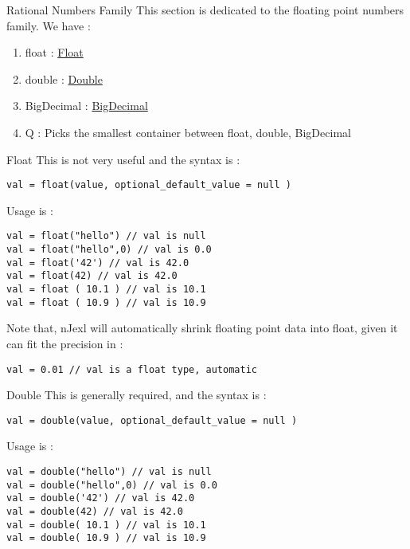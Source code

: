 \begin{section}{Rational Numbers Family}
This section is dedicated to the floating point numbers family.
We have :
\begin{enumerate}
\item{float : \href{https://docs.oracle.com/javase/8/docs/api/java/lang/Float.html}{Float} }
\item{double : \href{https://docs.oracle.com/javase/8/docs/api/java/lang/Double.html}{Double}}
\item{BigDecimal : \href{https://docs.oracle.com/javase/8/docs/api/java/math/BigDecimal.html}{BigDecimal} }
\item{Q : Picks the smallest container between float, double, BigDecimal }
\end{enumerate}

\begin{subsection}{Float}
This is not very useful and the syntax is :

\begin{lstlisting}[style=JexlStyle]
val = float(value, optional_default_value = null )
\end{lstlisting}

Usage is :

\begin{lstlisting}[style=JexlStyle]
val = float("hello") // val is null
val = float("hello",0) // val is 0.0
val = float('42') // val is 42.0 
val = float(42) // val is 42.0 
val = float ( 10.1 ) // val is 10.1 
val = float ( 10.9 ) // val is 10.9 
\end{lstlisting}
Note that, nJexl will automatically shrink floating point data into float, 
given it can fit the precision in :

\begin{lstlisting}[style=JexlStyle]
val = 0.01 // val is a float type, automatic
\end{lstlisting}


\end{subsection}


\begin{subsection}{Double}
This is generally required, and the syntax is :

\begin{lstlisting}[style=JexlStyle]
val = double(value, optional_default_value = null )
\end{lstlisting}

Usage is :

\begin{center}\begin{minipage}{\linewidth}
\begin{lstlisting}[style=JexlStyle]
val = double("hello") // val is null
val = double("hello",0) // val is 0.0
val = double('42') // val is 42.0 
val = double(42) // val is 42.0 
val = double( 10.1 ) // val is 10.1 
val = double( 10.9 ) // val is 10.9 
\end{lstlisting}
\end{minipage}\end{center}



\end{subsection}
\end{section}
